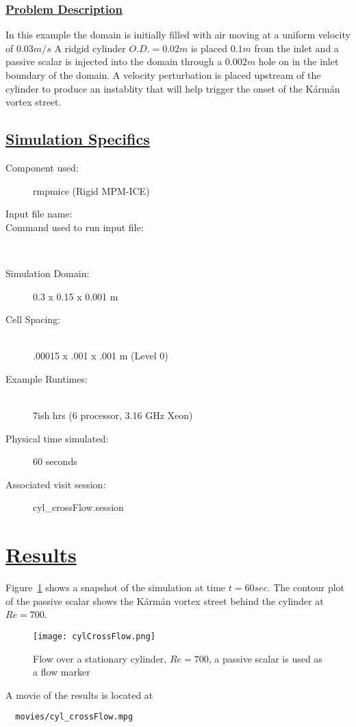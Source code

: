 \subsubsection*{\underline{Problem Description}}
In this example the domain is initially filled with air moving at a uniform velocity of $0.03m/s$  A ridgid cylinder $O.D. = 0.02m$ is placed $0.1m$ from the inlet and a passive scalar is injected into the domain through a $0.002m$ hole on in the inlet boundary of the domain.  A velocity perturbation is placed upstream of the cylinder to produce an instablity that will help trigger the onset of the K\'arm\'an vortex street.
%
\subsection*{\underline{Simulation Specifics}}
\begin{description}
\item [Component used:] \hfill rmpmice (Rigid MPM-ICE)
\item [Input file name:] \hfill {}
\item [Command used to run input file:]\hfill \\

\item [Simulation Domain:]\hfill    0.3 x 0.15 x 0.001 m

\item [Cell Spacing:]\hfill \\
.00015 x .001 x .001 m (Level 0)

\item [Example Runtimes:] \hfill \\
 7ish hrs   (6 processor, 3.16 GHz Xeon)\\

\item [Physical time simulated:] \hfill 60 seconds

\item [Associated visit session:] \hfill cyl\_crossFlow.session

\end{description}

\section*{\underline{Results}}

Figure~\ref{fig:cylCrossFlow} shows a snapshot of the simulation at time $t=60sec$.  The contour
plot of the passive scalar shows the K\'arm\'an vortex street behind the cylinder at $Re=700$.
\begin{figure}
  \center
  \texttt{[image: cylCrossFlow.png]}
  \caption{Flow over a stationary cylinder, $Re=700$, a passive scalar is used as a flow marker}
  \label{fig:cylCrossFlow}
\end{figure}
%
A movie of the results is located at
\begin{lstlisting}
  movies/cyl_crossFlow.mpg
\end{lstlisting}
\newpage

